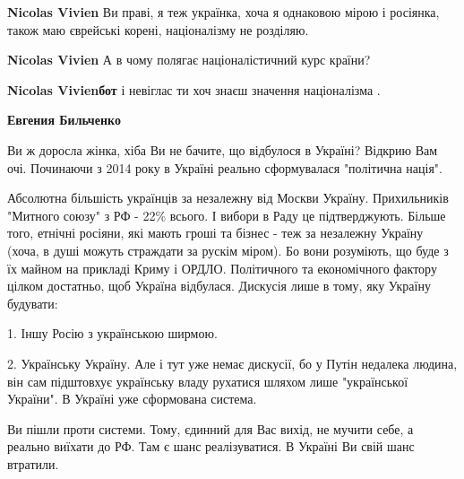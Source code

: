 \begin{itemize}
\begin{itemize}
 
\textbf{Nicolas Vivien} Ви праві, я теж українка, хоча я однаковою мірою і росіянка, також маю єврейські корені, націоналізму не розділяю.

 
\textbf{Nicolas Vivien} А в чому полягає націоналістичний курс країни?

 
\textbf{Nicolas Vivienбот} і невіглас ти хоч знаєш значення націоналізма .

 

\textbf{Евгения Бильченко} 

Ви ж доросла жінка, хіба Ви не бачите, що відбулося в Україні? Відкрию Вам очі.
Починаючи з 2014 року в Україні реально сформувалася "політична нація".

Абсолютна більшість українців за незалежну від Москви Україну. Прихильників
"Митного союзу" з РФ - 22\% всього. І вибори в Раду це підтверджують. Більше
того, етнічні росіяни, які мають гроші та бізнес - теж за незалежну Україну
(хоча, в душі можуть страждати за рускім міром). Бо вони розуміють, що буде з
їх майном на прикладі Криму і ОРДЛО. Політичного та економічного фактору цілком
достатньо, щоб Україна відбулася. Дискусія лише в тому, яку Україну будувати:

1. Іншу Росію з українською ширмою. 

2. Українську Україну. Але і тут уже немає дискусії, бо у Путін недалека
людина, він сам підштовхує українську владу рухатися шляхом лише "української
України". В Україні уже сформована система.

Ви пішли проти системи. Тому, єдинний для Вас вихід, не мучити себе, а реально
виїхати до РФ. Там є шанс реалізуватися. В Україні Ви свій шанс втратили.


\end{itemize}
\end{itemize}
